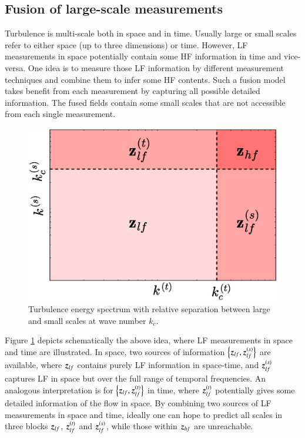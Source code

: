 \subsection{Fusion of large-scale measurements}
\label{sec:probdef2} 
Turbulence is multi-scale both in space and in time. Usually large or small scales refer to either space (up to three dimensions) or time. However, LF measurements in space potentially contain some HF information in time and vice-versa. One idea is to measure those LF information by different measurement techniques and combine them to infer some HF contents. Such a fusion model takes benefit from each measurement by capturing all possible detailed information. The fused fields contain some small scales that are not accessible from each single measurement. 

\begin{figure}
\centering
	\includegraphics[width=0.5\columnwidth]{./images/probdef/turbulence/space_time_wavedomain_long.eps}
	\caption{\label{fig:space_time_wavedomain} Turbulence energy spectrum with relative separation between large and small scales at wave number $ k_c $.}
\end{figure}

Figure \ref{fig:space_time_wavedomain} depicts schematically the above idea, where LF measurements in space and time are illustrated. In space, two sources of information $ \left\lbrace \operatorname{\boldsymbol{z}}_{lf}, \operatorname{\boldsymbol{z}}_{lf}^{(s)} \right\rbrace$ are available, where $ \operatorname{\boldsymbol{z}}_{lf} $ contains purely LF information in space-time, and $ \operatorname{\boldsymbol{z}}_{lf}^{(s)} $ captures LF in space but over the full range of temporal frequencies. An analogous interpretation is for $ \left\lbrace \operatorname{\boldsymbol{z}}_{lf}, \operatorname{\boldsymbol{z}}_{lf}^{(t)} \right\rbrace $ in time, where $ \operatorname{\boldsymbol{z}}_{lf}^{(t)} $ potentially gives some detailed information of the flow in space. By combining two sources of LF measurements in space and time, ideally one can hope to predict all scales in three blocks $ \operatorname{\boldsymbol{z}}_{lf} $, $ \operatorname{\boldsymbol{z}}_{lf}^{(t)} $ and $ \operatorname{\boldsymbol{z}}_{lf}^{(s)} $, while those within $ \operatorname{\boldsymbol{z}}_{hf} $ are unreachable. 

